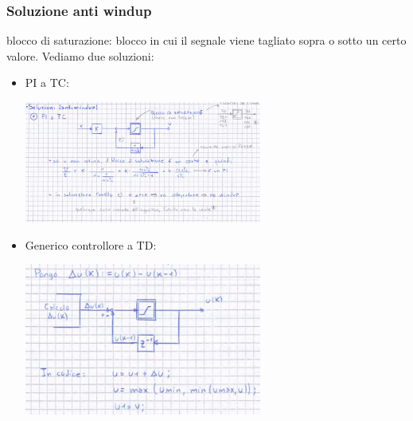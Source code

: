 \begin{landscape}
\begin{multicols*}{2}
    \subsubsection{Soluzione anti windup}
    blocco di saturazione: blocco in cui il segnale viene tagliato sopra o sotto un certo valore.\newline
    Vediamo due soluzioni:
    \begin{itemize}
        \item PI a TC: \begin{center}
            \includegraphics[height=4cm]{../formulario/img11.JPG}
        \end{center}
        \item Generico controllore a TD: \begin{center}
            \includegraphics[height=5cm]{../formulario/img12.jpg}
        \end{center}
    \end{itemize}
\end{multicols*}
\end{landscape}